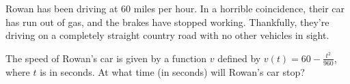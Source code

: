 \documentclass{ximera}
\author{Kenneth Berglund}
\begin{document}
\begin{exercise}
Rowan has been driving at 60 miles per hour. In a horrible coincidence, their car has run out of gas, and the brakes have stopped working. Thankfully, they're driving on a completely straight country road with no other vehicles in sight. 

The speed of Rowan's car is given by a function $v$ defined by $v(t) = 60 - \frac{t^2}{960}$, where $t$ is in seconds. At what time (in seconds) will Rowan's car stop?
\begin{multipleChoice}
\end{multipleChoice}

\end{exercise}
\end{document}
